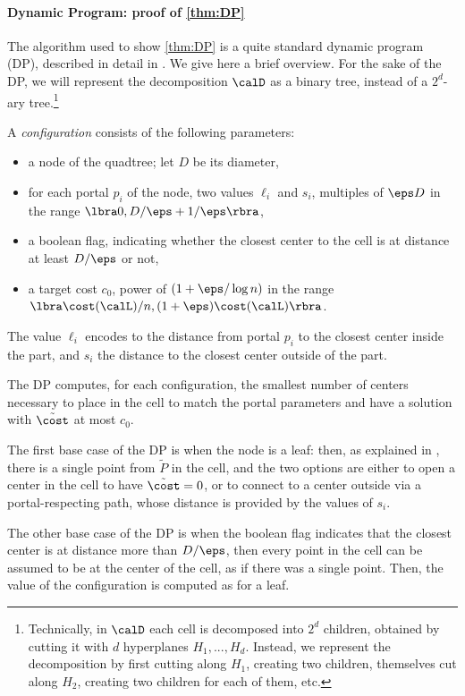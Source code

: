 \paragraph*{Dynamic Program: proof of \cref{thm:DP}}

The algorithm used to show \cref{thm:DP} is a quite standard dynamic program (DP), described in detail in \cite{jacm}. We give here a brief overview.
For the sake of the DP, we will represent the decomposition $\calD$ as a binary tree, instead of a $2^d$-ary tree.\footnote{Technically, in $\calD$ each cell is decomposed into $2^d$ children, obtained by cutting it with $d$ hyperplanes $H_1, ..., H_d$. Instead, we represent the decomposition by first cutting along $H_1$, creating two children, themselves cut along $H_2$, creating two children for each of them, etc.}

A \textit{configuration} consists of the following parameters: 
\begin{itemize}
    \item a node of the quadtree; let $D$ be its  diameter,
    \item for each portal $p_i$ of the node, two values $\ell_i$ and $s_i$, multiples of $\eps D$ in the range $\lbra 0, D/\eps + 1/\eps\rbra$,
    \item a boolean flag, indicating whether the closest center to the cell is at distance at least $D/\eps$ or not,
    \item a target cost $c_0$, power of $(1+\eps/\log n)$ in the range $\lbra \cost(\calL)/n, (1+\eps) \cost(\calL) \rbra$.
\end{itemize}
The value $\ell_i$ encodes to the distance from portal $p_i$ to the closest center inside the part, and $s_i$ the distance to the closest center outside of the part.

The DP computes, for each configuration, the smallest number of centers necessary to place in the cell to match the portal parameters and have a solution with $\tilde{\cost}$ at most $c_0$.

The first base case of the DP is when the node is a leaf: then, as explained in \cite{jacm}, there is a single point from $\tilde P$ in the cell, and the two options are either to open a center in the cell to have $\tilde{\cost} = 0$, or to connect to a center outside via a portal-respecting path, whose distance is provided by the values of $s_i$.

The other base case of the DP is when the boolean flag indicates that the closest center is at distance more than $D/\eps$, then every point in the cell can be assumed to be at the center of the cell, as if there was a single point. Then, the value of the configuration is computed as for a leaf.

